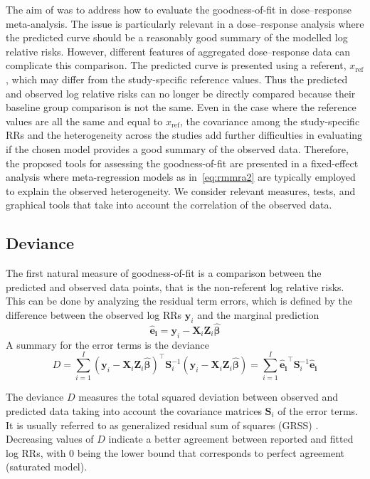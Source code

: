\documentclass[11pt,a4paper,twoside,openany]{book}\usepackage{knitr}
\begin{document}
{The aim of  was to address how to evaluate the goodness-of-fit in dose--response meta-analysis. The issue is particularly relevant in a dose--response analysis where the predicted curve should be a reasonably good summary of the modelled log relative risks. However, different features of aggregated dose--response data can complicate this comparison. The predicted curve is presented using a referent, $x_\mathrm{ref}$, which may differ from the study-specific reference values. Thus the predicted and observed log relative risks can no longer be directly compared because their baseline group comparison is not the same. Even in the case where the reference values are all the same and equal to $x_\mathrm{ref}$, the covariance among the study-specific RRs and the heterogeneity across the studies add further difficulties in evaluating if the chosen model provides a good summary of the observed data. Therefore, the proposed tools for assessing the goodness-of-fit are presented in a fixed-effect analysis where meta-regression models as in~\ref{eq:rmmra2} are typically employed to explain the observed heterogeneity. We consider relevant measures, tests, and graphical tools that take into account the correlation of the observed data.

\subsection{Deviance} 

The first natural measure of goodness-of-fit is a comparison between the predicted and observed data points, that is the non-referent log relative risks. This can be done by analyzing the residual term errors, which is defined by the difference between the observed log RRs $\mathbf{y}_i$ and the marginal prediction
\begin{equation}
\boldsymbol{\hat e_i} = \mathbf{y}_i - \mathbf{X}_i \mathbf{Z}_i \boldsymbol{\hat \beta}
\label{eq:residual}
\end{equation}\noindent A summary for the error terms is the deviance
\begin{equation}
D = \sum_{i=1}^I \left(\mathbf{y}_i - \mathbf{X}_i \mathbf{Z}_i \boldsymbol{\hat \beta} \right)^\top \mathbf{S}_i^{-1} \left(\mathbf{y}_i - \mathbf{X}_i \mathbf{Z}_i \boldsymbol{\hat \beta} \right) = \sum_{i=1}^I \boldsymbol{\hat e_i}^\top \mathbf{S}_i^{-1} \boldsymbol{\hat e_i}
\label{eq:deviance}
\end{equation}

\noindent The deviance $D$ measures the total squared deviation between observed and predicted data taking into account the covariance matrices $\mathbf{S}_i$ of the error terms. It is usually referred to as generalized residual sum of squares (GRSS) \citep{draper2014applied}. Decreasing values of $D$ indicate a better agreement between reported and fitted log RRs, with 0 being the lower bound that corresponds to perfect agreement (saturated model).

}
\end{document}
